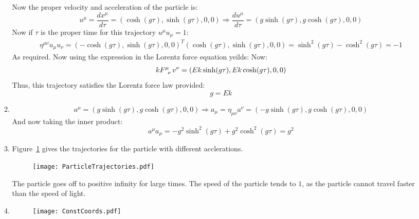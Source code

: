 \documentclass[12pt,a4]{article}
\begin{document}
\begin{enumerate}
\begin{enumerate}
        Now the proper velocity and acceleration of the particle is:
        \begin{equation*}
          u^\mu = \frac{d x^\mu}{d \tau} = (\cosh(g \tau), \sinh(g \tau), 0, 0) \Rightarrow \frac{d u^\mu}{d \tau} = (g \sinh(g \tau), g\cosh(g \tau), 0, 0)
        \end{equation*}
        Now if $\tau$ is the proper time for this trajectory $u^\mu u_\mu  = 1$:
        \begin{align*}
          \eta^{\mu\nu}u_\mu u_\nu = (-\cosh(g \tau), \sinh(g \tau), 0, 0)^T (\cosh(g \tau), \sinh(g \tau), 0, 0) = \sinh^2(g\tau) - \cosh^2(g \tau) = -1
        \end{align*}
        As required.
        Now using the expression in the Lorentz force equation yeilds:
        Now:
        \begin{align*}
          k\tensor{F}{^\mu_\nu}v^\nu = (Ek\sinh(g \tau), Ek\cosh(g \tau), 0, 0)
        \end{align*}
        Thus, this trajectory satisfies the Lorentz force law provided:
        \begin{equation*}
          g = Ek
        \end{equation*}
      \item
        \begin{equation*}
          a^\mu = (g \sinh(g \tau), g\cosh(g \tau), 0, 0) \Rightarrow a_\mu = \eta_{\mu\nu}a^\nu = (-g \sinh(g \tau), g\cosh(g \tau), 0, 0)
        \end{equation*}
        And now taking the inner product:
        \begin{equation*}
          a^\mu a_\mu = -g^2 \sinh^2(g \tau) + g^2\cosh^2(g \tau) = g^2
        \end{equation*}
      \item
        Figure~\ref{fig:partTrajectories} gives the trajectories for the particle with different acclerations.
        \begin{figure}[H]
          \centering
          \texttt{[image: ParticleTrajectories.pdf]}
          \label{fig:partTrajectories}
        \end{figure}
        The particle goes off to positive infinity for large times.
        The speed of the particle tends to $1$, as the particle cannot travel faster than the speed of light.
      \item
        \begin{figure}[H]
          \centering
          \texttt{[image: ConstCoords.pdf]}

\end{figure}
\end{enumerate}
\end{enumerate}
\end{document}
